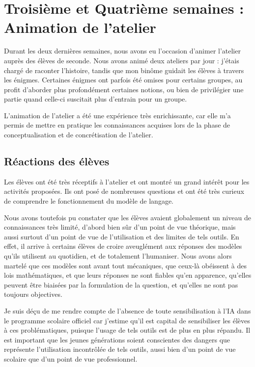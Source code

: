 \section{Troisième et Quatrième semaines : Animation de l'atelier}

  Durant les deux dernières semaines, nous avons eu l'occasion d'animer l'atelier auprès des élèves de seconde.
Nous avons animé deux ateliers par jour : j’étais chargé de raconter l’histoire, tandis que mon binôme guidait les élèves à travers les énigmes. Certaines énigmes ont parfois été omises pour certains groupes, au profit d'aborder plus profondément certaines notions, ou bien de privilégier une partie quand celle-ci suscitait plus d'entrain pour un groupe. \par
  L'animation de l'atelier a été une expérience très enrichissante, car elle m'a permis de mettre en pratique les connaissances acquises lors de la phase de conceptualisation et de concrétisation de l'atelier.
  \subsection{Réactions des élèves}
  Les élèves ont été très réceptifs à l'atelier et ont montré un grand intérêt pour les activités proposées. Ils ont posé de nombreuses questions et ont été très curieux de comprendre le fonctionnement du modèle de langage.  \par 
  Nous avons toutefois pu constater que les élèves avaient globalement un niveau de connaissances très limité, d'abord bien sûr d'un point de vue théorique, mais aussi surtout d'un point de vue de l'utilisation et des limites de tels outils. En effet, il arrive à certains élèves de croire aveuglément aux réponses des modèles qu'ils utilisent au quotidien, et de totalement l'humaniser. Nous avons alors martelé que ces modèles sont avant tout mécaniques, que ceux-là obéissent à des lois mathématiques, et que leurs réponses ne sont fiables qu'en apparence, qu'elles peuvent être biaisées par la formulation de la question, et qu'elles ne sont pas toujours objectives. \par
 Je suis déçu de me rendre compte de l'absence de toute sensibilisation à l'IA dans le programme scolaire officiel car j'estime qu'il est capital de sensibiliser les élèves à ces problématiques, puisque l'usage de tels outils est de plus en plus répandu. Il est important que les jeunes générations soient conscientes des dangers que représente l'utilisation incontrôlée de tels outils, aussi bien d'un point de vue scolaire que d'un point de vue professionnel.

